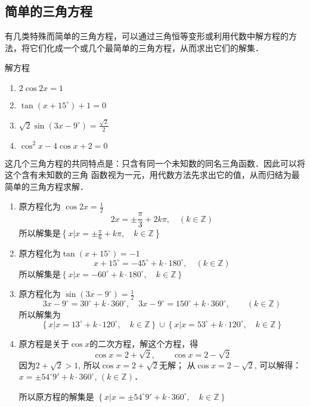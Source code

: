 \subsection{简单的三角方程}

有几类特殊而简单的三角方程，可以通过三角恒等变形或利用代数中解方程的方法，将它们化成一个或几个最简单的三角方程，从而求出它们的解集．

\begin{example}
    解方程
\begin{multicols}{2}
\begin{enumerate}
\item $2\cos2x=1$
\item $\tan (x+15^{\circ})+1=0$
\item $\sqrt{2}\sin(3x-9^{\circ})=\frac{\sqrt{2}}{2}$
\item $\cos^2x-4\cos x+2=0$
\end{enumerate}
\end{multicols}
\end{example}

\begin{analyze}
  这几个三角方程的共同特点是：只含有同一个未知数的同名三角函数．因此可以将这个含有未知数的三角  
  函数视为一元，用代数方法先求出它的值，从而归结为最简单的三角方程求解．
\end{analyze}

\begin{solution}
 \begin{enumerate}
     \item 原方程化为 $\cos 2x=\frac{1}{2}$
\[2x=\pm\frac{\pi}{3}+2k\pi,\quad (k\in\mathbb{Z})\] 
所以解集是$\left\{x\Big|x=\pm\frac{\pi}{6}+k\pi,\quad k\in\mathbb{Z}\right\}$
\item  原方程化为$\tan(x+15^{\circ})=-1$
\[x+15^{\circ}=-45^{\circ}+k\cdot 180^{\circ},\quad (k\in\mathbb{Z})\]
所以解集是$\left\{x\Big|x=-60^{\circ}+k\cdot 180^{\circ},\quad k\in\mathbb{Z}\right\}$
\item 原方程化为 $\sin(3x-9^{\circ})=\frac{1}{2}$
\[3x-9^{\circ}=30^{\circ}+k\cdot 360^{\circ},\quad 3x-9^{\circ}=150^{\circ}+k\cdot 360^{\circ},\qquad (k\in\mathbb{Z})\]
所以解集为$$\left\{x\Big|x=13^{\circ}+k\cdot 120^{\circ},\quad k\in\mathbb{Z}\right\}\cup \left\{x\Big|x=53^{\circ}+k\cdot 120^{\circ},\quad k\in\mathbb{Z}\right\}$$
\item 原方程是关于$\cos x$的二次方程，解这个方程，得
\[\cos x=2+\sqrt{2},\qquad \cos x=2-\sqrt{2}\]
因为$2+\sqrt{2}>1$, 所以$\cos x=2+\sqrt{2}$无解；
从$\cos x=2-\sqrt{2}$, 可以解得：$x=\pm 54^{\circ}9'+k\cdot 360^{\circ}$, $(k\in\mathbb{Z})$．

所以原方程的解集是
$\left\{x\Big|x=\pm 54^{\circ}9'+k\cdot 360^{\circ},\quad k\in\mathbb{Z}\right\}$
 \end{enumerate}  
\end{solution}

